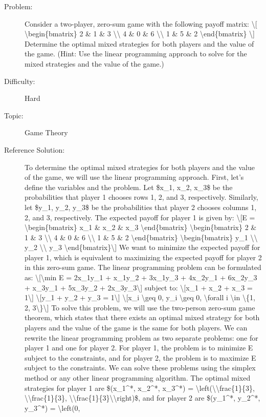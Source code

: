 \documentclass{article}%
\begin{document}
\begin{description}%
\item[Problem: ]%
Consider a two{-}player, zero{-}sum game with the following payoff matrix: \textbackslash{}{[} \textbackslash{}begin\{bmatrix\} 2 \& 1 \& 3 \textbackslash{}\textbackslash{} 4 \& 0 \& 6 \textbackslash{}\textbackslash{} 1 \& 5 \& 2 \textbackslash{}end\{bmatrix\} \textbackslash{}{]} Determine the optimal mixed strategies for both players and the value of the game. (Hint: Use the linear programming approach to solve for the mixed strategies and the value of the game.)%
\item[Difficulty: ]%
Hard%
\item[Topic: ]%
Game Theory%
\item[Reference Solution: ]%
To determine the optimal mixed strategies for both players and the value of the game, we will use the linear programming approach. First, let's define the variables and the problem. Let \$x\_1, x\_2, x\_3\$ be the probabilities that player 1 chooses rows 1, 2, and 3, respectively. Similarly, let \$y\_1, y\_2, y\_3\$ be the probabilities that player 2 chooses columns 1, 2, and 3, respectively. The expected payoff for player 1 is given by: \textbackslash{}{[}E = \textbackslash{}begin\{bmatrix\} x\_1 \& x\_2 \& x\_3 \textbackslash{}end\{bmatrix\} \textbackslash{}begin\{bmatrix\} 2 \& 1 \& 3 \textbackslash{}\textbackslash{} 4 \& 0 \& 6 \textbackslash{}\textbackslash{} 1 \& 5 \& 2 \textbackslash{}end\{bmatrix\} \textbackslash{}begin\{bmatrix\} y\_1 \textbackslash{}\textbackslash{} y\_2 \textbackslash{}\textbackslash{} y\_3 \textbackslash{}end\{bmatrix\}\textbackslash{}{]} We want to minimize the expected payoff for player 1, which is equivalent to maximizing the expected payoff for player 2 in this zero{-}sum game. The linear programming problem can be formulated as: \textbackslash{}{[}\textbackslash{}min E = 2x\_1y\_1 + x\_1y\_2 + 3x\_1y\_3 + 4x\_2y\_1 + 6x\_2y\_3 + x\_3y\_1 + 5x\_3y\_2 + 2x\_3y\_3\textbackslash{}{]} subject to: \textbackslash{}{[}x\_1 + x\_2 + x\_3 = 1\textbackslash{}{]} \textbackslash{}{[}y\_1 + y\_2 + y\_3 = 1\textbackslash{}{]} \textbackslash{}{[}x\_i \textbackslash{}geq 0, y\_i \textbackslash{}geq 0, \textbackslash{}forall i \textbackslash{}in \textbackslash{}\{1, 2, 3\textbackslash{}\}\textbackslash{}{]} To solve this problem, we will use the two{-}person zero{-}sum game theorem, which states that there exists an optimal mixed strategy for both players and the value of the game is the same for both players. We can rewrite the linear programming problem as two separate problems: one for player 1 and one for player 2. For player 1, the problem is to minimize E subject to the constraints, and for player 2, the problem is to maximize E subject to the constraints. We can solve these problems using the simplex method or any other linear programming algorithm. The optimal mixed strategies for player 1 are \$(x\_1\^{}*, x\_2\^{}*, x\_3\^{}*) = \textbackslash{}left(\textbackslash{}\textbackslash{}frac\{1\}\{3\}, \textbackslash{}\textbackslash{}frac\{1\}\{3\}, \textbackslash{}\textbackslash{}frac\{1\}\{3\}\textbackslash{}\textbackslash{}right)\$, and for player 2 are \$(y\_1\^{}*, y\_2\^{}*, y\_3\^{}*) = \textbackslash{}left(0, 
\end{description}
\end{document}
